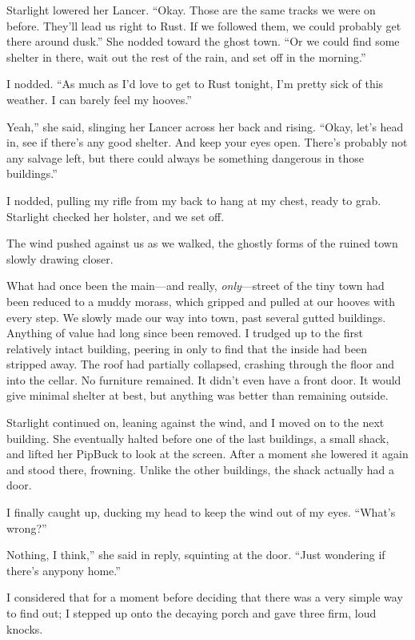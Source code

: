 Starlight lowered her Lancer. “Okay. Those are the same tracks we were on before. They’ll lead us right to Rust. If we followed them, we could probably get there around dusk.” She nodded toward the ghost town. “Or we could find some shelter in there, wait out the rest of the rain, and set off in the morning.”

I nodded. “As much as I’d love to get to Rust tonight, I’m pretty sick of this weather. I can barely feel my hooves.”

\leavevmode{}Yeah,” she said, slinging her Lancer across her back and rising. “Okay, let’s head in, see if there’s any good shelter. And keep your eyes open. There’s probably not any salvage left, but there could always be something dangerous in those buildings.”

I nodded, pulling my rifle from my back to hang at my chest, ready to grab. Starlight checked her holster, and we set off.

The wind pushed against us as we walked, the ghostly forms of the ruined town slowly drawing closer.

What had once been the main—and really, \textit{only}—street of the tiny town had been reduced to a muddy morass, which gripped and pulled at our hooves with every step. We slowly made our way into town, past several gutted buildings. Anything of value had long since been removed. I trudged up to the first relatively intact building, peering in only to find that the inside had been stripped away. The roof had partially collapsed, crashing through the floor and into the cellar. No furniture remained. It didn’t even have a front door. It would give minimal shelter at best, but anything was better than remaining outside.

Starlight continued on, leaning against the wind, and I moved on to the next building. She eventually halted before one of the last buildings, a small shack, and lifted her PipBuck to look at the screen. After a moment she lowered it again and stood there, frowning. Unlike the other buildings, the shack actually had a door.

I finally caught up, ducking my head to keep the wind out of my eyes. “What’s wrong?”

\leavevmode{}Nothing, I think,” she said in reply, squinting at the door. “Just wondering if there’s anypony home.”

I considered that for a moment before deciding that there was a very simple way to find out; I stepped up onto the decaying porch and gave three firm, loud knocks.

